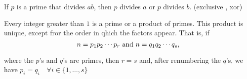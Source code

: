\begin{thm-non}
  If $p$ is a prime that divides $ab$, then $p$ divides $a$ or $p$ divides $b$. (exclusive , xor)
\end{thm-non}

\begin{thm}
  Every integer greater than $1$ is a prime or a product of primes. This product is unique, except fror the order in qhich the factors appear. That is, if
  \begin{equation}
    n = p_1 p_2 \cdots p_r $ and $ n= q_1 q_2 \cdots q_s,
  \end{equation}

  where the $p$'s and $q$'s are primes, then $r=s$ and, after renumbering the $q$'s, we have $p_i = q_i \quad \forall i \in \{1, \ldots, s\}$
\end{thm}
